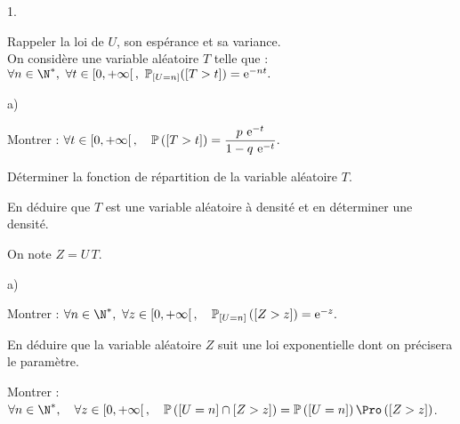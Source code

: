\documentclass[11pt]{article}%
\begin{document}
\begin{noliste}{1.}
 \setlength{\itemsep}{4mm}
\item Rappeler la loi de $U$, son espérance et sa variance.\\
On considère une variable aléatoire $T$ telle que :
\qquad $\forall n\in \N^*,\ \forall t\in \left[ 0, + \infty
\right[, \ \Prob_{\Ev{ U = n} }(\Ev{ T>t}) = \ee^{-nt}.$

\item
\begin{noliste}{a)}
 \setlength{\itemsep}{2mm}
\item Montrer : $\forall t\in \left[ 0, + \infty \right[,\quad
\mathbb{P}\left(\left[ {T>t} \right]\right) = \dfrac{p~\text{e}^{-t}}{1-q~\text{e}^{-t}}.$

\item Déterminer la fonction de répartition de la variable
aléatoire $T$.

\item En déduire que $T$ est une variable aléatoire à densité
et en déterminer une densité.
\end{noliste}

\item On note $Z = U \, T$.

\begin{noliste}{a)}
 \setlength{\itemsep}{2mm}
\item Montrer : $\forall n\in \N^*,\ \forall z\in \left[
0, + \infty \right[,\quad \Prob_{\Ev{ U = n} }\left(\Ev{
Z>z}\right) = \ee^{-z}.$

\item En déduire que la variable aléatoire $Z$ suit une loi
exponentielle dont on précisera le paramètre.

\item Montrer : $\forall n\in \N^*, \quad \forall z\in \left[
0, + \infty \right[,\quad \Prob \left( \Ev{U = n} \cap \Ev{Z>z}\right) =
\Prob\left(\Ev{U = n}\right) \Pro\left(\Ev{ Z>z}\right)$.
\end{noliste}
\end{noliste}
\end{document}
